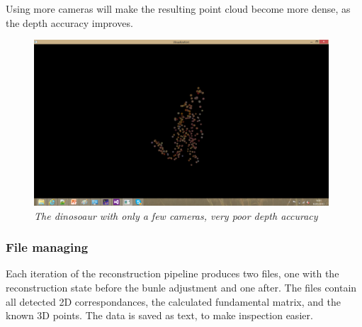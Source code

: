 Using more cameras will make the resulting point cloud become more dense, as the depth accuracy improves.

\begin{figure}[htb]
	\centering
	\includegraphics[width=110mm]{images/pointCloudAllCam.png}
	\caption{\textit{The dinosoaur with only a few cameras, very poor depth accuracy}}
	\label{fig:pointCloudAllCam}  %
\end{figure}

\subsubsection{File managing}
Each iteration of the reconstruction pipeline produces two files, one with the reconstruction state before the bunle adjustment and one after. The files contain all detected 2D correspondances, the calculated fundamental matrix, and the known 3D points. The data is saved as text, to make inspection easier.
